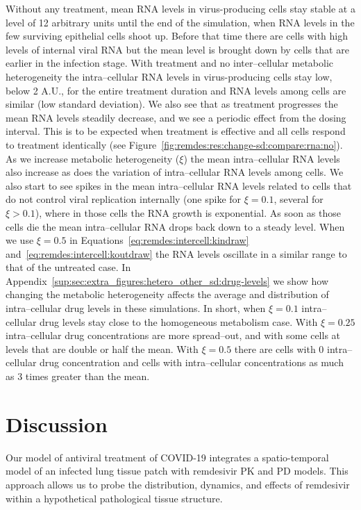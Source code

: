 Without any treatment, mean RNA levels in virus-producing cells stay stable at a level of 12 arbitrary units until the end of the simulation, when RNA levels in the few surviving epithelial cells shoot up. Before that time there are cells with high levels of internal viral RNA but the mean level is brought down by cells that are earlier in the infection stage. With treatment and no inter--cellular metabolic heterogeneity the intra--cellular RNA levels in virus-producing cells stay low, below 2 A.U., for the entire treatment duration and RNA levels among cells are similar (low standard deviation). We also see that as treatment progresses the mean RNA levels steadily decrease, and we see a periodic effect from the dosing interval. This is to be expected when treatment is effective and all cells respond to treatment identically (see Figure~\ref{fig:remdes:res:change-sd:compare:rna:no}). As we increase metabolic heterogeneity ($\xi$) the mean intra--cellular RNA levels also increase as does the variation of intra--cellular RNA levels among cells. We also start to see spikes in the mean intra--cellular RNA levels related to cells that do not control viral replication internally (one spike for $\xi=0.1$, several for $\xi>0.1$), where in those cells the RNA growth is exponential. As soon as those cells die the mean intra--cellular RNA drops back down to a steady level. When we use $\xi=0.5$ in Equations~\ref{eq:remdes:intercell:kindraw} and~\ref{eq:remdes:intercell:koutdraw} the RNA levels oscillate in a similar range to that of the untreated case. In Appendix~\ref{sup:sec:extra_figures:hetero_other_sd:drug-levels} we show how changing the metabolic heterogeneity affects the average and distribution of intra--cellular drug levels in these simulations. In short, when $\xi=0.1$ intra--cellular drug levels stay close to the homogeneous metabolism case. With $\xi=0.25$ intra--cellular drug concentrations are more spread--out, and with some cells at levels that are double or half the mean. With $\xi=0.5$ there are cells with 0 intra--cellular drug concentration and cells with intra--cellular concentrations as much as 3 times greater than the mean.



\section{Discussion}\label{sec:remdes:dis}
Our model of antiviral treatment of COVID-19 integrates a spatio-temporal model of an infected lung tissue patch with remdesivir PK and PD models. This approach allows us to probe the distribution, dynamics, and effects of remdesivir within a hypothetical pathological tissue structure. 

